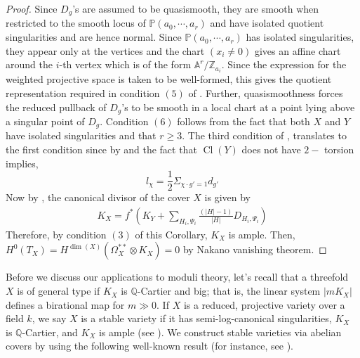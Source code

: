 \documentclass[12pt,twoside,]{amsart}
\theoremstyle{plain}
\theoremstyle{definition}
\begin{document}
\begin{proof}
 Since $D_g$'s are assumed to be quasismooth, they are smooth when restricted to the smooth locus of $\mathbb{P}(a_0,\cdots,a_r)$ and have isolated quotient singularities and are hence normal. Since $\mathbb{P}(a_0,\cdots,a_r)$ has isolated singularities, they appear only at the vertices and the chart $(x_i \neq 0)$ gives an affine chart around the $i$-th vertex which is of the form $\mathbb{A}^{r}/\mathbb{Z}_{a_i}$. Since the expression for the weighted projective space is taken to be well-formed, this gives the quotient representation required in condition $(5)$ of . Further, quasismoothness forces the reduced pullback of $D_g$'s to be smooth in a local chart at a point lying above a singular point of $D_g$. Condition $(6)$ follows from the fact that both $X$ and $Y$ have isolated singularities and that $r \geq 3$.
 The third condition of , translates to the first condition since by \cite[Proposition $2.1$]{pardini1991abelian} and the fact that $\operatorname{Cl}(Y)$ does not have $2-$ torsion implies, 
$$l_{\chi} = \displaystyle\frac{1}{2} \Sigma_{\chi \cdot g' = 1} d_{g'}$$
 Now by \cite[Prop 4.2]{pardini1991abelian}, the canonical divisor of the cover $X$ is given by 
 \begin{align*}
    K_X = f^* 
       \left( 
    K_Y + \sum_{H_i, \Psi_i} \frac{(|H|-1)}{|H|} D_{H_i, \Psi_i}
       \right)
   \end{align*}
Therefore, by condition $(3)$ of this Corollary, $K_X$ is ample. Then, $H^0(T_X) = H^{\operatorname{dim}(X)}(\Omega_X^{**} \otimes K_X) = 0$ by Nakano vanishing theorem.
\end{proof}

Before we discuss our applications to moduli theory, let's recall that a threefold $X$ is of general type if $K_X$ is $\mathbb{Q}$-Cartier and big; that is, the linear system $|mK_X|$ defines a birational map for $m \gg 0$. If $X$ is a reduced, projective variety over a field $k$, we say $X$ is a stable variety if it has semi-log-canonical singularities, $K_X$ is $\mathbb{Q}$-Cartier, and $K_X$ is ample (see \cite[Definition 1.41]{kollar2017families}). We construct stable varieties via abelian covers by using the following well-known result (for instance, see \cite[Thm 6.1.5]{alexeev2015moduli}).
\end{document}
